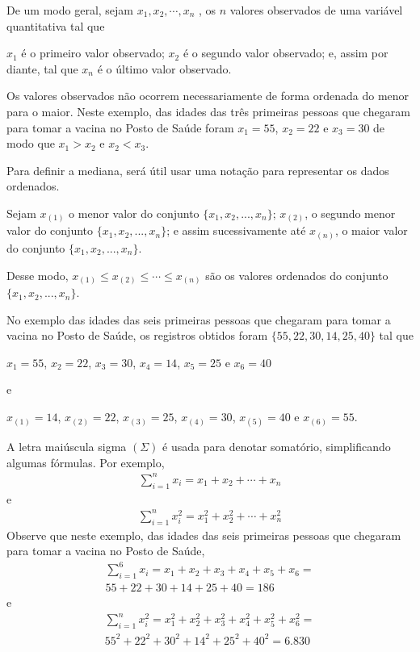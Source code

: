 De um modo geral, sejam \(x_1,x_2, \cdots, x_n\) , os \(n\) valores observados de uma variável quantitativa tal que

\(x_1\) é o primeiro valor observado; \(x_2\) é o segundo valor observado; e, assim por diante, tal que \(x_n\) é o último valor observado.

Os valores observados não ocorrem necessariamente de forma ordenada do menor para o maior. Neste exemplo, das idades das três primeiras pessoas que chegaram para tomar a vacina no Posto de Saúde foram \(x_1=55\), \(x_2=22\) e \(x_3=30\) de modo que \(x_1>x_2\) e \(x_2<x_3\).

Para definir a mediana, será útil usar uma notação para representar os dados ordenados.

Sejam \(x_{(1)}\) o menor valor do conjunto \(\{ x_1,x_2,...,x_n\}\); \(x_{(2)}\), o segundo menor valor do conjunto \(\{ x_1,x_2,...,x_n\}\); e assim sucessivamente até \(x_{(n)}\), o maior valor do conjunto \(\{ x_1,x_2,...,x_n\}\).

Desse modo,
\(x_{(1)}\leq x_{(2)}\leq \cdots\leq x_{(n)}\) são os valores ordenados do conjunto \(\{ x_1,x_2,...,x_n\}\).

No exemplo das idades das seis primeiras pessoas que chegaram para tomar a vacina no Posto de Saúde, os registros obtidos foram \(\{55, 22, 30, 14, 25, 40\}\) tal que

\(x_1=55\), \(x_2=22\), \(x_3=30\), \(x_4=14\), \(x_5=25\) e \(x_6=40\)

e

\(x_{(1)}=14\), \(x_{(2)}=22\), \(x_{(3)}=25\), \(x_{(4)}=30\), \(x_{(5)}=40\) e \(x_{(6)}=55\).

A letra maiúscula sigma \(\left (\Sigma\right )\) é usada para denotar somatório, simplificando algumas fórmulas. Por exemplo,
\begin{equation*}
\begin{split}\sum^n_{i=1} x_i=x_1+x_2+\cdots +x_n\end{split}
\end{equation*}
e
\begin{equation*}
\begin{split}\sum^n_{i=1} x^2_i=x^2_1+x^2_2+\cdots +x^2_n\end{split}
\end{equation*}
Observe que neste exemplo, das idades das seis primeiras pessoas que chegaram para tomar a vacina no Posto de Saúde,
\begin{equation*}
\begin{split}\sum^6_{i=1}x_i=x_1+x_2+x_3+x_4+x_5+x_6=\\
55 + 22 + 30 + 14 + 25 + 40 = 186\end{split}
\end{equation*}
e
\begin{equation*}
\begin{split}\sum^n_{i=1} x^2_i=x^2_1+x^2_2+x^2_3+x^2_4+x^2_5 +x^2_6=\\
55^2+ 22^2+ 30^2+ 14^2+ 25^2+  40^2=6.830\end{split}
\end{equation*}

